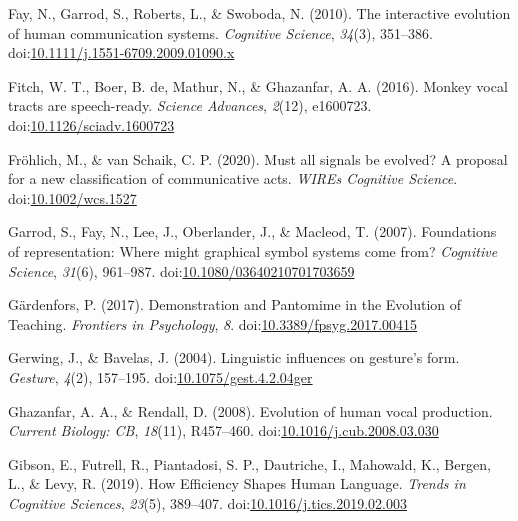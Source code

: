 \documentclass[
  man, noextraspace,floatsintext]{apa6}
\newlength{\cslhangindent}
\newenvironment{cslreferences}%
  {\setlength{\parindent}{0pt}%
  \everypar{\setlength{\hangindent}{\cslhangindent}}\ignorespaces}%
  {\par}
\begin{document}
\begin{cslreferences}
\leavevmode\hypertarget{ref-fayInteractiveEvolutionHuman2010}{}%
Fay, N., Garrod, S., Roberts, L., \& Swoboda, N. (2010). The interactive evolution of human communication systems. \emph{Cognitive Science}, \emph{34}(3), 351--386. doi:\href{https://doi.org/10.1111/j.1551-6709.2009.01090.x}{10.1111/j.1551-6709.2009.01090.x}

\leavevmode\hypertarget{ref-fitchMonkeyVocalTracts2016}{}%
Fitch, W. T., Boer, B. de, Mathur, N., \& Ghazanfar, A. A. (2016). Monkey vocal tracts are speech-ready. \emph{Science Advances}, \emph{2}(12), e1600723. doi:\href{https://doi.org/10.1126/sciadv.1600723}{10.1126/sciadv.1600723}

\leavevmode\hypertarget{ref-frohlichMustAllSignals2020}{}%
Fröhlich, M., \& van Schaik, C. P. (2020). Must all signals be evolved? A proposal for a new classification of communicative acts. \emph{WIREs Cognitive Science}. doi:\href{https://doi.org/10.1002/wcs.1527}{10.1002/wcs.1527}

\leavevmode\hypertarget{ref-garrodFoundationsRepresentationWhere2007}{}%
Garrod, S., Fay, N., Lee, J., Oberlander, J., \& Macleod, T. (2007). Foundations of representation: Where might graphical symbol systems come from? \emph{Cognitive Science}, \emph{31}(6), 961--987. doi:\href{https://doi.org/10.1080/03640210701703659}{10.1080/03640210701703659}

\leavevmode\hypertarget{ref-gardenforsDemonstrationPantomimeEvolution2017}{}%
Gärdenfors, P. (2017). Demonstration and Pantomime in the Evolution of Teaching. \emph{Frontiers in Psychology}, \emph{8}. doi:\href{https://doi.org/10.3389/fpsyg.2017.00415}{10.3389/fpsyg.2017.00415}

\leavevmode\hypertarget{ref-gerwingLinguisticInfluencesGesture2004}{}%
Gerwing, J., \& Bavelas, J. (2004). Linguistic influences on gesture's form. \emph{Gesture}, \emph{4}(2), 157--195. doi:\href{https://doi.org/10.1075/gest.4.2.04ger}{10.1075/gest.4.2.04ger}

\leavevmode\hypertarget{ref-ghazanfarEvolutionHumanVocal2008}{}%
Ghazanfar, A. A., \& Rendall, D. (2008). Evolution of human vocal production. \emph{Current Biology: CB}, \emph{18}(11), R457--460. doi:\href{https://doi.org/10.1016/j.cub.2008.03.030}{10.1016/j.cub.2008.03.030}

\leavevmode\hypertarget{ref-gibsonHowEfficiencyShapes2019}{}%
Gibson, E., Futrell, R., Piantadosi, S. P., Dautriche, I., Mahowald, K., Bergen, L., \& Levy, R. (2019). How Efficiency Shapes Human Language. \emph{Trends in Cognitive Sciences}, \emph{23}(5), 389--407. doi:\href{https://doi.org/10.1016/j.tics.2019.02.003}{10.1016/j.tics.2019.02.003}


\end{cslreferences}
\end{document}

